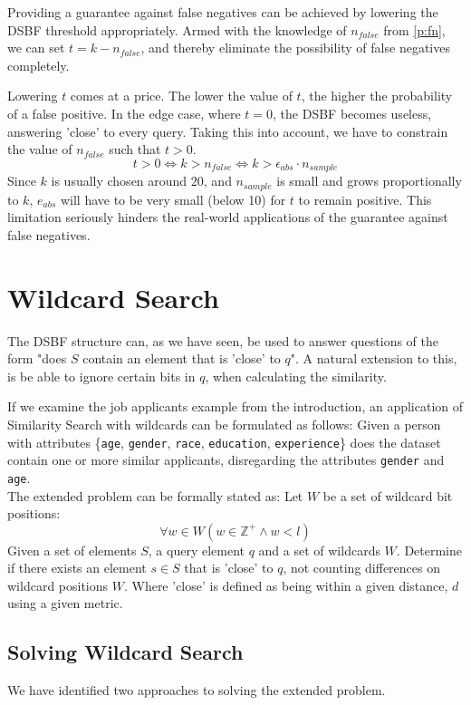\documentclass[a4paper,11pt]{article}
\begin{document}
Providing a guarantee against false negatives can be achieved by lowering the DSBF threshold appropriately. Armed with the knowledge of $n_{false}$ from \ref{p:fn}, we can set $t = k - n_{false}$, and thereby eliminate the possibility of false negatives completely.

Lowering $t$ comes at a price. The lower the value of $t$, the higher the probability of a false positive. In the edge case, where $t=0$, the DSBF becomes useless, answering 'close' to every query. Taking this into account, we have to constrain the value of $n_{false}$ such that $t>0$.
\[t > 0 \Leftrightarrow k > n_{false} \Leftrightarrow k > \epsilon_{abs} \cdot n_{sample}\]
Since $k$ is usually chosen around $20$, and $n_{sample}$ is small and grows proportionally to $k$, $e_{abs}$ will have to be very small (below 10) for $t$ to remain positive. This limitation seriously hinders the real-world applications of the guarantee against false negatives.

\section{Wildcard Search}
The DSBF structure can, as we have seen, be used to answer questions of the form "does $S$ contain an element that is 'close' to $q$". A natural extension to this, is be able to ignore certain bits in $q$, when calculating the similarity.

If we examine the job applicants example from the introduction, an application of Similarity Search with wildcards can be formulated as follows: Given a person with attributes \{\texttt{age}, \texttt{gender}, \texttt{race}, \texttt{education}, \texttt{experience}\} does the dataset contain one or more similar applicants, disregarding the attributes \texttt{gender} and \texttt{age}.\\

The extended problem can be formally stated as: Let $W$ be a set of wildcard bit positions:
\[\forall w \in W (w \in \mathbb{Z}^+ \land w < l)\]
Given a set of elements $S$, a query element $q$ and a set of wildcards $W$. Determine if there exists an element $s \in S$ that is 'close' to $q$, not counting differences on wildcard positions $W$. Where 'close' is defined as being within a given distance, $d$ using a given metric.

\subsection{Solving Wildcard Search}
We have identified two approaches to solving the extended problem.
\end{document}
